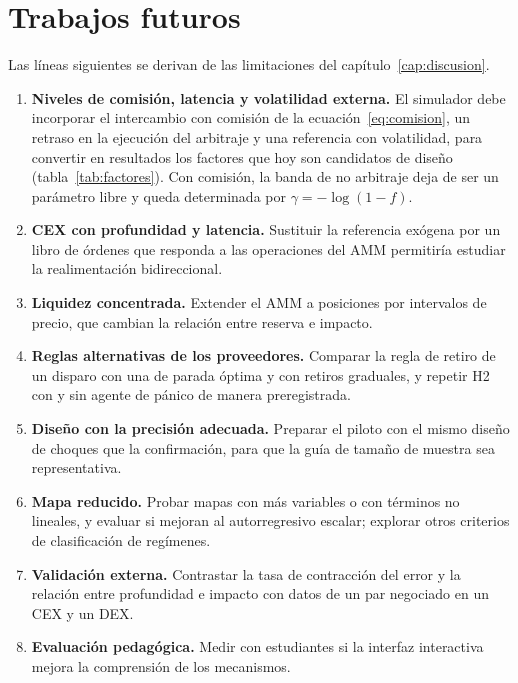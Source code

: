 \chapter{Trabajos futuros}
\label{cap:futuro}

Las líneas siguientes se derivan de las limitaciones del capítulo~\ref{cap:discusion}.

\begin{enumerate}
  \item \textbf{Niveles de comisión, latencia y volatilidad externa.} El simulador debe incorporar el intercambio con comisión de la ecuación~\eqref{eq:comision}, un retraso en la ejecución del arbitraje y una referencia con volatilidad, para convertir en resultados los factores que hoy son candidatos de diseño (tabla~\ref{tab:factores}). Con comisión, la banda de no arbitraje deja de ser un parámetro libre y queda determinada por $\gamma=-\log(1-f)$.
  \item \textbf{CEX con profundidad y latencia.} Sustituir la referencia exógena por un libro de órdenes que responda a las operaciones del AMM permitiría estudiar la realimentación bidireccional.
  \item \textbf{Liquidez concentrada.} Extender el AMM a posiciones por intervalos de precio, que cambian la relación entre reserva e impacto.
  \item \textbf{Reglas alternativas de los proveedores.} Comparar la regla de retiro de un disparo con una de parada óptima \cite{bergault2025exit} y con retiros graduales, y repetir H2 con y sin agente de pánico de manera preregistrada.
  \item \textbf{Diseño con la precisión adecuada.} Preparar el piloto con el mismo diseño de choques que la confirmación, para que la guía de tamaño de muestra sea representativa.
  \item \textbf{Mapa reducido.} Probar mapas con más variables o con términos no lineales, y evaluar si mejoran al autorregresivo escalar; explorar otros criterios de clasificación de regímenes.
  \item \textbf{Validación externa.} Contrastar la tasa de contracción del error y la relación entre profundidad e impacto con datos de un par negociado en un CEX y un DEX.
  \item \textbf{Evaluación pedagógica.} Medir con estudiantes si la interfaz interactiva mejora la comprensión de los mecanismos.
\end{enumerate}
